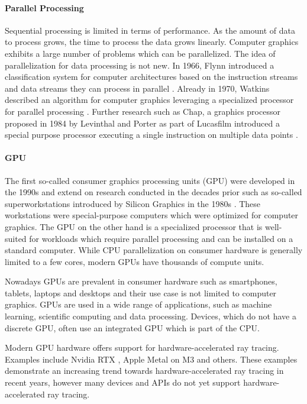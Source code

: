 \paragraph{Parallel Processing}

Sequential processing is limited in terms of performance. As the amount of data to process grows, the time to process the data grows linearly. Computer graphics exhibits a large number of problems which can be parallelized. The idea of parallelization for data processing is not new. In 1966, Flynn introduced a classification system for computer architectures based on the instruction streams and data streams they can process in parallel \cite{flynnTaxonomy,flynnTaxonomy2}. Already in 1970, Watkins described an algorithm for computer graphics leveraging a specialized processor for parallel processing \cite{surfaceAlgorithmProcessor}. Further research such as Chap, a  graphics processor proposed in 1984 by Levinthal and Porter as part of Lucasfilm introduced a special purpose processor executing a single instruction on multiple data points \cite{chapSIMDgpu}.

\paragraph{GPU}

The first so-called consumer graphics processing units (GPU) were developed in the 1990s and extend on research conducted in the decades prior such as so-called superworkstations introduced by Silicon Graphics in the 1980s \cite{sigWorkstation}. These workstations were special-purpose computers which were optimized for computer graphics. The GPU on the other hand is a specialized processor that is well-suited for workloads which require parallel processing and can be installed on a standard computer. While CPU parallelization on consumer hardware is generally limited to a few cores, modern GPUs have thousands of compute units.

Nowadays GPUs are prevalent in consumer hardware such as smartphones, tablets, laptops and desktops and their use case is not limited to computer graphics. GPUs are used in a wide range of applications, such as machine learning, scientific computing and data processing. Devices, which do not have a discrete GPU, often use an integrated GPU which is part of the CPU.

Modern GPU hardware offers support for hardware-accelerated ray tracing. Examples include Nvidia RTX \cite{nvidiaRtxRayTracing}, Apple Metal on M3 \cite{appleM3GpuAdvancements} and others. These examples demonstrate an increasing trend towards hardware-accelerated ray tracing in recent years, however many devices and \gls{API}s do not yet support hardware-accelerated ray tracing.

